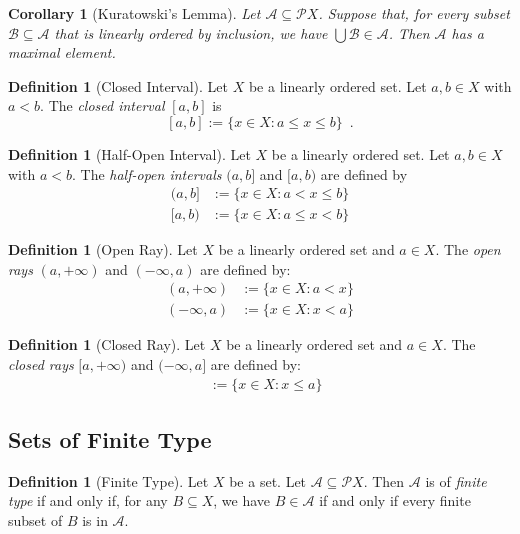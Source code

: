 \documentclass{book}
\newtheorem{cor}{Corollary}[ax]
\theoremstyle{definition}
\newtheorem{df}[ax]{Definition}
\begin{document}
\begin{cor}[Kuratowski's Lemma]
Let $\mathcal{A} \subseteq \mathcal{P} X$. Suppose that, for every subset $\mathcal{B} \subseteq \mathcal{A}$ that is linearly ordered by inclusion, we have $\bigcup \mathcal{B} \in \mathcal{A}$. Then $\mathcal{A}$ has a maximal element.
\end{cor}

\begin{df}[Closed Interval]
Let $X$ be a linearly ordered set. Let $a,b \in X$ with $a < b$. The \emph{closed interval} $[a,b]$ is
\[ [a,b] := \{ x \in X : a \leq x \leq b \} \enspace . \]
\end{df}

\begin{df}[Half-Open Interval]
Let $X$ be a linearly ordered set. Let $a,b \in X$ with $a < b$. The \emph{half-open intervals} $(a,b]$ and $[a,b)$ are defined by
\begin{align*}
(a,b] & := \{ x \in X : a < x \leq b \} \\
[a,b) & := \{ x \in X : a \leq x < b \}
\end{align*}
\end{df}

\begin{df}[Open Ray]
Let $X$ be a linearly ordered set and $a \in X$. The \emph{open rays} $(a, +\infty)$ and $(-\infty, a)$ are defined by:
\begin{align*}
(a, +\infty) & := \{ x \in X : a < x \} \\
(-\infty, a) & := \{ x \in X : x < a \}
\end{align*}
\end{df}

\begin{df}[Closed Ray]
Let $X$ be a linearly ordered set and $a \in X$. The \emph{closed rays} $[a, +\infty)$ and $(-\infty, a]$ are defined by:
\begin{align*}
[a, +\infty) & := \{ x \in X : a \leq x \} \\
(-\infty, a] & := \{ x \in X : x \leq a \}
\end{align*}
\end{df}

\subsection{Sets of Finite Type}

\begin{df}[Finite Type]
Let $X$ be a set. Let $\mathcal{A} \subseteq \mathcal{P} X$. Then $\mathcal{A}$ is of \emph{finite type} if and only if, for any $B \subseteq X$, we have $B \in \mathcal{A}$ if and only if every finite subset of $B$ is in $\mathcal{A}$.
\end{df}
\end{document}
